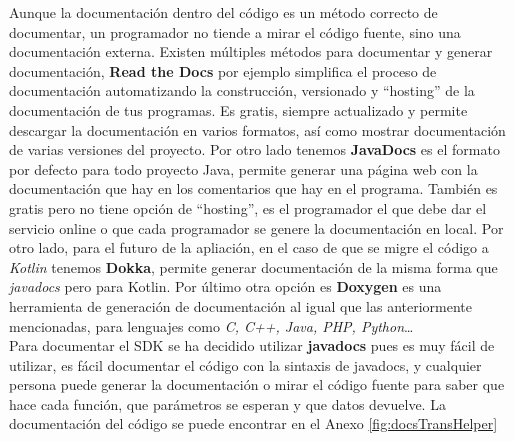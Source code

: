 Aunque la documentación dentro del código es un método correcto de documentar, un programador no tiende a mirar el código fuente, sino una documentación externa. Existen múltiples métodos para documentar y generar documentación, \textbf{Read the Docs}\cite{readthedocs} por ejemplo simplifica el proceso de documentación automatizando la construcción, versionado y ``hosting'' de la documentación de tus programas. Es gratis, siempre actualizado y permite descargar la documentación en varios formatos, así como mostrar documentación de varias versiones del proyecto. Por otro lado tenemos \textbf{JavaDocs}\cite{javadocs} es el formato por defecto para todo proyecto Java, permite generar una página web con la documentación que hay en los comentarios que hay en el programa. También es gratis pero no tiene opción de ``hosting'', es el programador el que debe dar el servicio online o que cada programador se genere la documentación en local. Por otro lado, para el futuro de la apliación, en el caso de que se migre el código a \emph{Kotlin} tenemos \textbf{Dokka}\cite{dokka}, permite generar documentación de la misma forma que \emph{javadocs} pero para Kotlin. Por último otra opción es \textbf{Doxygen}\cite{doxygen} es una herramienta de generación de documentación al igual que las anteriormente mencionadas, para lenguajes como \emph{C, C++, Java, PHP, Python}\dots\\

Para documentar el SDK se ha decidido utilizar \textbf{javadocs} pues es muy fácil de utilizar, es fácil documentar el código con la sintaxis de javadocs, y cualquier persona puede generar la documentación o mirar el código fuente para saber que hace cada función, que parámetros se esperan y que datos devuelve. La documentación del código se puede encontrar en el Anexo \ref{fig:docsTransHelper}

